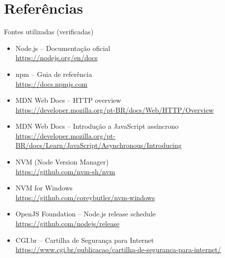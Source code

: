 \documentclass[aspectratio=169]{beamer}
\begin{document}
\section{Refer\^encias}

\begin{frame}[allowframebreaks]{Fontes utilizadas (verificadas)}
\footnotesize
\begin{itemize}
  \item Node.js -- Documenta\c{c}\~ao oficial\\
  \url{https://nodejs.org/en/docs}

  \item npm -- Guia de refer\^encia\\
  \url{https://docs.npmjs.com}

  \item MDN Web Docs -- HTTP overview\\
  \url{https://developer.mozilla.org/pt-BR/docs/Web/HTTP/Overview}

  \item MDN Web Docs -- Introdu\c{c}\~ao a JavaScript ass\'incrono\\
  \url{https://developer.mozilla.org/pt-BR/docs/Learn/JavaScript/Asynchronous/Introducing}

  \item NVM (Node Version Manager)\\
  \url{https://github.com/nvm-sh/nvm}

  \item NVM for Windows\\
  \url{https://github.com/coreybutler/nvm-windows}

  \item OpenJS Foundation -- Node.js release schedule\\
  \url{https://github.com/nodejs/release}

  \item CGI.br -- Cartilha de Seguran\c{c}a para Internet\\
  \url{https://www.cgi.br/publicacao/cartilha-de-seguranca-para-internet/}
\end{itemize}
\end{frame}
\end{document}
